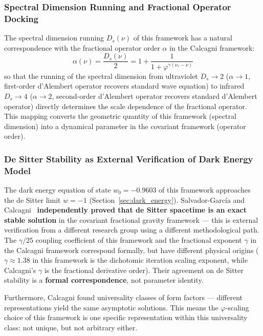 \documentclass[12pt,a4paper,twocolumn]{article}
\renewcommand{\phi}{\varphi}
\begin{document}
\subsubsection{Spectral Dimension Running and Fractional Operator Docking}

The spectral dimension running $D_s(\nu)$ of this framework has a natural correspondence with the fractional operator order $\alpha$ in the Calcagni framework:
\begin{equation}
\alpha(\nu) = \frac{D_s(\nu)}{2} = 1 + \frac{1}{1+\phi^{\gamma(\nu_* - \nu)}}
\label{eq:alpha_nu_mapping}
\end{equation}
so that the running of the spectral dimension from ultraviolet $D_s\to 2$ ($\alpha\to 1$, first-order d'Alembert operator recovers standard wave equation) to infrared $D_s\to 4$ ($\alpha\to 2$, second-order d'Alembert operator recovers standard d'Alembert operator) directly determines the scale dependence of the fractional operator. This mapping converts the geometric quantity of this framework (spectral dimension) into a dynamical parameter in the covariant framework (operator order).

\subsubsection{De Sitter Stability as External Verification of Dark Energy Model}

The dark energy equation of state $w_0 = -0.9603$ of this framework approaches the de Sitter limit $w = -1$ (Section~\ref{sec:dark_energy}). Salvador-Garc\'ia and Calcagni~\cite{SalvadorGarcia2026} \textbf{independently proved that de Sitter spacetime is an exact stable solution} in the covariant fractional gravity framework --- this is external verification from a different research group using a different methodological path. The $\gamma/25$ coupling coefficient of this framework and the fractional exponent $\gamma$ in the Calcagni framework correspond formally, but have different physical origins ($\gamma\approx 1.38$ in this framework is the dichotomic iteration scaling exponent, while Calcagni's $\gamma$ is the fractional derivative order). Their agreement on de Sitter stability is a \textbf{formal correspondence}, not parameter identity.

Furthermore, Calcagni found universality classes of form factors --- different representations yield the same asymptotic solutions. This means the $\phi$-scaling choice of this framework is one specific representation within this universality class: not unique, but not arbitrary either.
\end{document}
